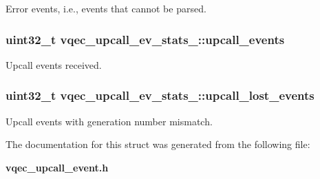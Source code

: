 Error events, i.e., events that cannot be parsed. 
\subsubsection{\setlength{\rightskip}{0pt plus 5cm}uint32\_\-t \bf{vqec\_\-upcall\_\-ev\_\-stats\_\-::upcall\_\-events}}\label{structvqec__upcall__ev__stats___b006ca2cc32c62cc22ba5aa080b02e60}


Upcall events received. 
\subsubsection{\setlength{\rightskip}{0pt plus 5cm}uint32\_\-t \bf{vqec\_\-upcall\_\-ev\_\-stats\_\-::upcall\_\-lost\_\-events}}\label{structvqec__upcall__ev__stats___7c47487473bf1a770266b6881d325e9e}


Upcall events with generation number mismatch. 

The documentation for this struct was generated from the following file:\begin{CompactItemize}
\item 
\bf{vqec\_\-upcall\_\-event.h}\end{CompactItemize}
